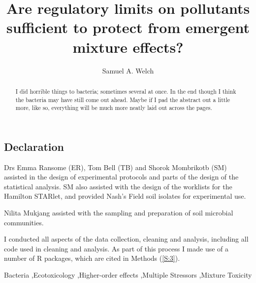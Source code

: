 \documentclass[final,1p,times]{elsarticle}
\begin{document}
\begin{frontmatter}


\section{Declaration}

Drs Emma Ransome (ER), Tom Bell (TB) and Shorok Mombrikotb (SM) assisted in the design of experimental protocols and parts of the design of the statistical analysis. SM also assisted with the design of the worklists for the Hamilton STARlet, and provided Nash's Field soil isolates for experimental use.

Nilita Mukjang assisted with the sampling and preparation of soil microbial communities.

I conducted all aspects of the data collection, cleaning and analysis, including all code used in cleaning and analysis. As part of this process I made use of a number of R packages, which are cited in Methods (\cref{S:3}).
\newpage

\title{Are regulatory limits on pollutants sufficient to protect from emergent mixture effects?}


\author{Samuel A. Welch}

\address{Silwood Park, Imperial College London, United Kingdom}

\begin{abstract}
I did horrible things to bacteria; sometimes several at once. In the end though I think the bacteria may have still come out ahead. Maybe if I pad the abstract out a little more, like so, everything will be much more neatly laid out across the pages. 
\end{abstract}

\begin{keyword}
Bacteria \sep Ecotoxicology \sep Higher-order effects \sep Multiple Stressors \sep Mixture Toxicity


\end{keyword}

\end{frontmatter}
\end{document}
